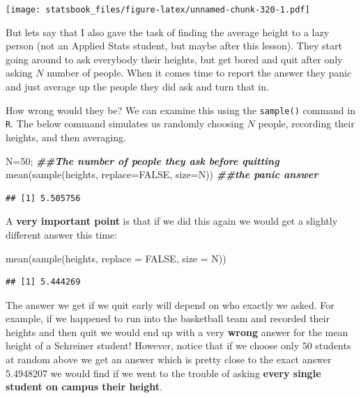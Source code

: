 \documentclass[
]{book}
\newenvironment{Shaded}{\begin{snugshade}}{\end{snugshade}}
\newcommand{\AttributeTok}[1]{\textcolor[rgb]{0.77,0.63,0.00}{#1}}
\newcommand{\ConstantTok}[1]{\textcolor[rgb]{0.00,0.00,0.00}{#1}}
\newcommand{\DecValTok}[1]{\textcolor[rgb]{0.00,0.00,0.81}{#1}}
\newcommand{\DocumentationTok}[1]{\textcolor[rgb]{0.56,0.35,0.01}{\textbf{\textit{#1}}}}
\newcommand{\FunctionTok}[1]{\textcolor[rgb]{0.00,0.00,0.00}{#1}}
\newcommand{\NormalTok}[1]{#1}
\newcommand{\OtherTok}[1]{\textcolor[rgb]{0.56,0.35,0.01}{#1}}
\theoremstyle{definition}
\theoremstyle{definition}
\theoremstyle{definition}
\theoremstyle{definition}
\theoremstyle{remark}
\begin{document}
\texttt{[image: statsbook\_files/figure-latex/unnamed-chunk-320-1.pdf]}

But lets say that I also gave the task of finding the average height to a lazy person (not an Applied Stats student, but maybe after this lesson). They start going around to ask everybody their heights, but get bored and quit after only asking \(N\) number of people. When it comes time to report the answer they panic and just average up the people they did ask and turn that in.

How wrong would they be? We can examine this using the \texttt{sample()} command in \texttt{R}. The below command simulates us randomly choosing \(N\) people, recording their heights, and then averaging.

\begin{Shaded}
\begin{Highlighting}[]
\NormalTok{N}\OtherTok{=}\DecValTok{50}\NormalTok{; }\DocumentationTok{\#\#The number of people they ask before quitting}
\FunctionTok{mean}\NormalTok{(}\FunctionTok{sample}\NormalTok{(heights, }\AttributeTok{replace=}\ConstantTok{FALSE}\NormalTok{, }\AttributeTok{size=}\NormalTok{N)) }\DocumentationTok{\#\#the panic answer}
\end{Highlighting}
\end{Shaded}

\begin{verbatim}
## [1] 5.505756
\end{verbatim}

A \textbf{very important point} is that if we did this again we would get a slightly different answer this time:

\begin{Shaded}
\begin{Highlighting}[]
\FunctionTok{mean}\NormalTok{(}\FunctionTok{sample}\NormalTok{(heights, }\AttributeTok{replace =} \ConstantTok{FALSE}\NormalTok{, }\AttributeTok{size =}\NormalTok{ N))}
\end{Highlighting}
\end{Shaded}

\begin{verbatim}
## [1] 5.444269
\end{verbatim}

The answer we get if we quit early will depend on who exactly we asked. For example, if we happened to run into the basketball team and recorded their heights and then quit we would end up with a very \textbf{wrong} answer for the mean height of a Schreiner student! However, notice that if we choose only \(50\) students at random above we get an answer which is pretty close to the exact answer 5.4948207 we would find if we went to the trouble of asking \textbf{every single student on campus their height}.
\end{document}

